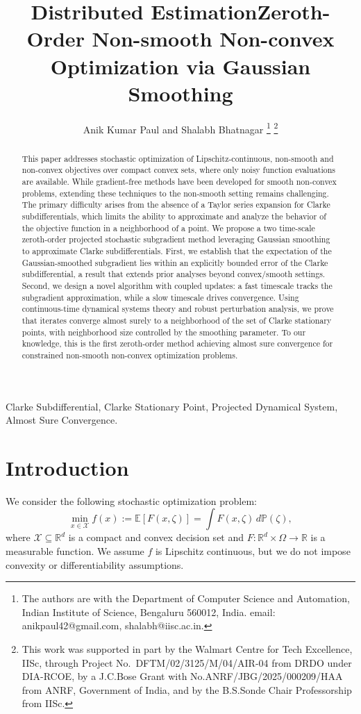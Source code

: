 \documentclass[9pt,journal,twoside,web]{ieeecolor}
\title{\LARGE \bf Distributed Estimation}
\author{Anik Kumar Paul and Shalabh Bhatnagar
\thanks{The authors are with the Department of Computer Science and Automation, Indian Institute of Science, Bengaluru 560012, India.
        {email: anikpaul42@gmail.com, shalabh@iisc.ac.in.}}
\thanks{This work was supported in part by the Walmart Centre for Tech Excellence, IISc, through Project No.~DFTM/02/3125/M/04/AIR-04 from DRDO under DIA-RCOE, by a J.C.Bose Grant with No.ANRF/JBG/2025/000209/HAA from ANRF, Government of India, and by the B.S.Sonde Chair Professorship from IISc.}
    }
\begin{document}
\title{Zeroth-Order Non-smooth Non-convex Optimization via Gaussian Smoothing}%
\maketitle
\thispagestyle{plain}
\pagestyle{plain}
\begin{abstract}
    This paper addresses stochastic optimization of Lipschitz-continuous, non-smooth and non-convex objectives over compact convex sets, where only noisy function evaluations are available. While gradient-free methods have been developed for smooth non-convex problems, extending these techniques to the non-smooth setting remains challenging. The primary difficulty arises from the absence of a Taylor series expansion for Clarke subdifferentials, which limits the ability to approximate and analyze the behavior of the objective function in a neighborhood of a point. We propose a two time-scale zeroth-order projected stochastic subgradient method leveraging Gaussian smoothing to approximate Clarke subdifferentials. First, we establish that the expectation of the Gaussian-smoothed subgradient lies within an explicitly bounded error of the Clarke subdifferential, a result that extends prior analyses beyond convex/smooth settings. Second, we design a novel algorithm with coupled updates: a fast timescale tracks the subgradient approximation, while a slow timescale drives convergence. Using continuous-time dynamical systems theory and robust perturbation analysis, we prove that iterates converge almost surely to a neighborhood of the set of Clarke stationary points, with neighborhood size controlled by the smoothing parameter. To our knowledge, this is the first zeroth-order method achieving almost sure convergence for constrained non-smooth non-convex optimization problems. 
\end{abstract}
\begin{keywords}
    Clarke Subdifferential, Clarke Stationary Point, Projected Dynamical System, Almost Sure Convergence.
\end{keywords}

\section{Introduction}
We consider the following stochastic optimization problem:
\begin{equation}
    \min_{x \in \mathcal{X}} f(x) := \mathbb{E} [F(x,\zeta)] = \int F(x,\zeta) \, d\mathbb{P}(\zeta),
    \label{eq:main_problem}
\end{equation}
where $\mathcal{X} \subseteq \mathbb{R}^d$ is a compact and convex decision set and $F: \mathbb{R}^d \times \Omega \to \mathbb{R}$ is a measurable function. We assume $f$ is Lipschitz continuous, but we do not impose convexity or differentiability assumptions. 
\end{document}
